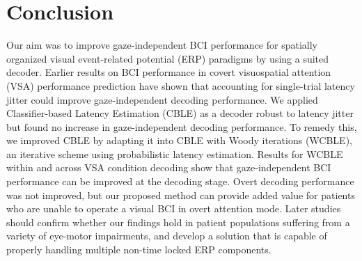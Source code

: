 \section{Conclusion}
Our aim was to improve gaze-independent BCI performance for spatially
organized visual event-related potential (ERP) paradigms by using a suited
decoder.
Earlier results on BCI performance in covert visuospatial attention
(VSA) performance prediction have shown that accounting for single-trial
latency jitter could improve gaze-independent decoding performance.
We applied Classifier-based Latency Estimation (CBLE) as a decoder robust to latency
jitter but found no increase in gaze-independent decoding performance.
To remedy this, we improved CBLE by adapting it into CBLE with Woody
iterations (WCBLE), an iterative scheme using probabilistic latency estimation.
Results for WCBLE within and across VSA condition decoding show that
gaze-independent BCI performance can be improved at the decoding stage.
Overt decoding performance was not improved, but our proposed method can
provide added value for patients who are unable to operate a visual BCI in overt
attention mode.
Later studies should confirm whether our findings hold in patient
populations suffering from a variety of eye-motor impairments, and develop a
solution that is capable of properly handling multiple non-time locked ERP
components.
